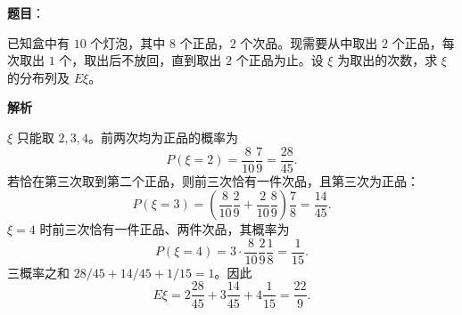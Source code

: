 \begin{answer}

\textbf{题目}：

已知盒中有 $10$ 个灯泡，其中 $8$ 个正品，$2$ 个次品。现需要从中取出 $2$ 个正品，每次取出 $1$ 个，取出后不放回，直到取出 $2$ 个正品为止。设 $\xi$ 为取出的次数，求 $\xi$ 的分布列及 $E\xi$。

\textbf{解析}

$\xi$ 只能取 $2,3,4$。前两次均为正品的概率为
\nopagebreak[4]
\[
P(\xi=2)=\frac8{10}\frac7{9}=\frac{28}{45}.
\]
若恰在第三次取到第二个正品，则前三次恰有一件次品，且第三次为正品：
\nopagebreak[4]
\[
P(\xi=3)=\left(\frac8{10}\frac2{9}+\frac2{10}\frac8{9}\right)\frac7{8}
=\frac{14}{45}.
\]
$\xi=4$ 时前三次恰有一件正品、两件次品，其概率为
\nopagebreak[4]
\[
P(\xi=4)=3\cdot\frac8{10}\frac2{9}\frac1{8}=\frac{1}{15}.
\]
三概率之和 $28/45+14/45+1/15=1$。因此
\nopagebreak[4]
\[
E\xi=2\frac{28}{45}+3\frac{14}{45}+4\frac{1}{15}=\frac{22}{9}.
\]


\end{answer}
